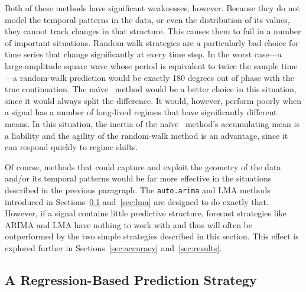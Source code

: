 \documentclass[%
pre,
reprint,
superscriptaddress,
showpacs,
nofootinbib,
nobibnotes,
 amsmath,amssymb,
 aps,
]{revtex4-1}
\newcommand{\cmark}{\ding{51}}
\newcommand{\arima}{{\tt auto.arima}\xspace}
\newcommand{\naive}{na\"ive}
\begin{document}
Both of these methods have significant weaknesses, however.  Because
they do not model the temporal patterns in the data, or even the
distribution of its values, they cannot track changes in that
structure.  This causes them to fail in a number of important
situations.  Random-walk strategies are a particularly bad choice for
time series that change significantly at every time step.  In the
worst case---a large-amplitude square wave whose period is equivalent
to twice the sample time---a random-walk prediction would be exactly
180 degrees out of phase with the true continuation.  The \naive
~method would be a better choice in this situation, since it would
always split the difference.  It would, however, perform poorly when a
signal has a number of long-lived regimes that have significantly
different means.  In this situation, the inertia of the \naive
~method's accumulating mean is a liability and the agility of the
random-walk method is an advantage, since it can respond quickly to
regime shifts.

Of course, methods that could capture and exploit the geometry of the
data and/or its temporal patterns would be far more effective in the
situations described in the previous paragraph.  The \arima and LMA
methods introduced in Sections~\ref{sec:arima} and~\ref{sec:lma} are
designed to do exactly that.
However, if a signal contains little predictive structure, forecast
strategies like ARIMA and LMA have nothing to work with and thus will
often be outperformed by the two simple strategies described in this
section.  This effect is explored further in Sections~\ref{sec:accuracy}
and~\ref{sec:results}.


\subsection{A Regression-Based Prediction Strategy}
\label{sec:arima}


\end{document}
